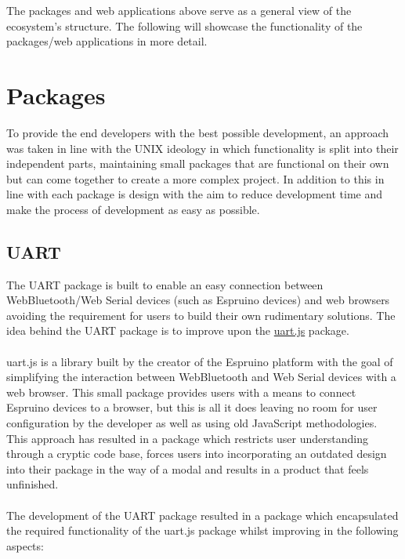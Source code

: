 \documentclass{l4proj}
\begin{document}
The packages and web applications above serve as a general view of the ecosystem's structure. The following will showcase the functionality of the packages/web applications in more detail.

\section{Packages}

To provide the end developers with the best possible development, an approach was taken in line with the UNIX ideology \cite{TheArtOfUNIXProgramming} in which functionality is split into their independent parts, maintaining small packages that are functional on their own but can come together to create a more complex project. In addition to this in line with \cite{de2003package} each package is design with the aim to reduce development time and make the process of development as easy as possible.

\subsection{UART}

The UART package is built to enable an easy connection between WebBluetooth/Web Serial devices (such as Espruino devices) and web browsers avoiding the requirement for users to build their own rudimentary solutions. The idea behind the UART package is to improve upon the \href{https://www.espruino.com/UART.js}{uart.js} package. 
\\ \\
uart.js is a library built by the creator of the Espruino platform with the goal of simplifying the interaction between WebBluetooth and Web Serial devices with a web browser. This small package provides users with a means to connect Espruino devices to a browser, but this is all it does leaving no room for user configuration by the developer as well as using old JavaScript methodologies. This approach has resulted in a package which restricts user understanding through a cryptic code base, forces users into incorporating an outdated design into their package in the way of a modal and results in a product that feels unfinished.
\\ \\
The development of the UART package resulted in a package which encapsulated the required functionality of the uart.js package whilst improving in the following aspects: 
\\  
\end{document}
